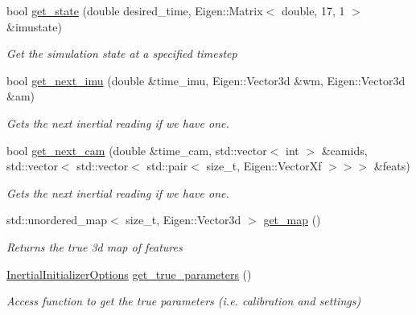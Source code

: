 \begin{DoxyCompactItemize}
bool \hyperlink{classov__init_1_1SimulatorInit_abe1fc7470175ceb0b60a9ba8461a21b3}{get\+\_\+state} (double desired\+\_\+time, Eigen\+::\+Matrix$<$ double, 17, 1 $>$ \&imustate)
\begin{DoxyCompactList}\small\item\em Get the simulation state at a specified timestep \end{DoxyCompactList}\item 
bool \hyperlink{classov__init_1_1SimulatorInit_a84a06f52d0de40b6e3ce274a47512e9e}{get\+\_\+next\+\_\+imu} (double \&time\+\_\+imu, Eigen\+::\+Vector3d \&wm, Eigen\+::\+Vector3d \&am)
\begin{DoxyCompactList}\small\item\em Gets the next inertial reading if we have one. \end{DoxyCompactList}\item 
bool \hyperlink{classov__init_1_1SimulatorInit_a3101f4237fc14a77d8d4b6de038bd323}{get\+\_\+next\+\_\+cam} (double \&time\+\_\+cam, std\+::vector$<$ int $>$ \&camids, std\+::vector$<$ std\+::vector$<$ std\+::pair$<$ size\+\_\+t, Eigen\+::\+Vector\+Xf $>$$>$$>$ \&feats)
\begin{DoxyCompactList}\small\item\em Gets the next inertial reading if we have one. \end{DoxyCompactList}\item 
\mbox{\label{classov__init_1_1SimulatorInit_ac7b4f53f1aa8775c636976cb912cad64}} 
std\+::unordered\+\_\+map$<$ size\+\_\+t, Eigen\+::\+Vector3d $>$ \hyperlink{classov__init_1_1SimulatorInit_ac7b4f53f1aa8775c636976cb912cad64}{get\+\_\+map} ()
\begin{DoxyCompactList}\small\item\em Returns the true 3d map of features \end{DoxyCompactList}\item 
\mbox{\label{classov__init_1_1SimulatorInit_a1c311cdb3c5de359ca6a8080fda13de6}} 
\hyperlink{structov__init_1_1InertialInitializerOptions}{Inertial\+Initializer\+Options} \hyperlink{classov__init_1_1SimulatorInit_a1c311cdb3c5de359ca6a8080fda13de6}{get\+\_\+true\+\_\+parameters} ()
\begin{DoxyCompactList}\small\item\em Access function to get the true parameters (i.\+e. calibration and settings) \end{DoxyCompactList}\end{DoxyCompactItemize}
